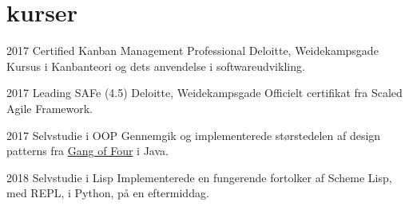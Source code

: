 \documentclass[]{../friggeri-cv} %
\begin{document}
\section{kurser}
\begin{entrylist}


\entry
{2017}
{Certified Kanban Management Professional}
{Deloitte, Weidekampsgade}
{Kursus i Kanbanteori og dets anvendelse i softwareudvikling.}

\entry
{2017}
{Leading SAFe (4.5)}
{Deloitte, Weidekampsgade}
{Officielt certifikat fra Scaled Agile Framework.}

\entry
{2017}
{Selvstudie {\normalfont i OOP}}
{}
{Gennemgik og implementerede størstedelen af design patterns fra \href{https://books.google.dk/books?id=6oHuKQe3TjQC}{Gang of Four} i Java.}


\entry
{2018}
{Selvstudie {\normalfont i Lisp}}
{}
{Implementerede en fungerende fortolker af Scheme Lisp, med REPL, i Python, på en eftermiddag.}

\end{entrylist}



\end{document}
